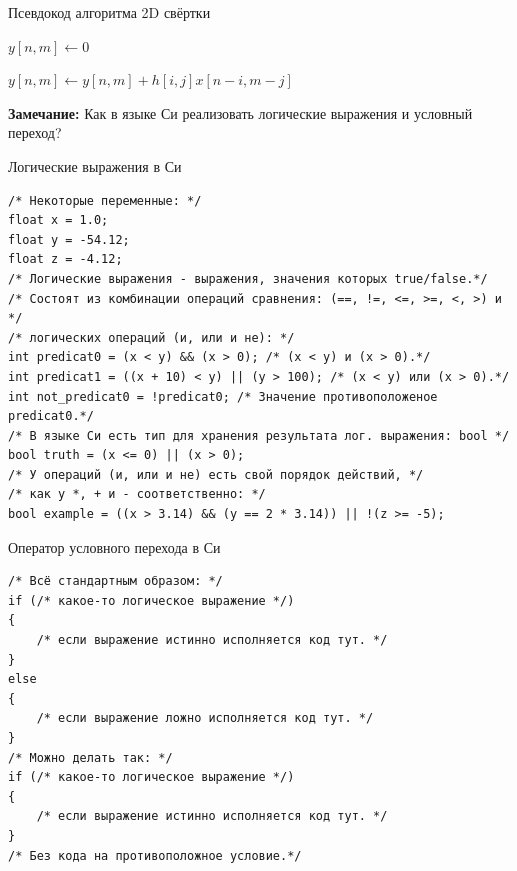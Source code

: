 \documentclass{beamer}
\begin{document}
    \begin{frame}{Псевдокод алгоритма 2D свёртки}
        \begin{algorithm}[H]
            \BlankLine
            {
                {
                    $y[n, m] \leftarrow 0$
                    \par
                    {
                        {
                            {
                                 $y[n, m] \leftarrow y[n, m] + h[i, j]x[n - i, m- j]$
                            }
                        }
                    }
                }
            }
        \end{algorithm}
        \par
        \justifying
        {\bf Замечание:} Как в языке Си реализовать логические выражения и условный переход?
    \end{frame}
    \begin{frame}[fragile]{Логические выражения в Си}
        \begin{verbatim}
/* Некоторые переменные: */
float x = 1.0;
float y = -54.12;
float z = -4.12;
/* Логические выражения - выражения, значения которых true/false.*/
/* Состоят из комбинации операций сравнения: (==, !=, <=, >=, <, >) и */
/* логических операций (и, или и не): */
int predicat0 = (x < y) && (x > 0); /* (x < y) и (x > 0).*/
int predicat1 = ((x + 10) < y) || (y > 100); /* (x < y) или (x > 0).*/
int not_predicat0 = !predicat0; /* Значение противоположеное predicat0.*/
/* В языке Си есть тип для хранения результата лог. выражения: bool */
bool truth = (x <= 0) || (x > 0);
/* У операций (и, или и не) есть свой порядок действий, */
/* как у *, + и - соответственно: */
bool example = ((x > 3.14) && (y == 2 * 3.14)) || !(z >= -5);
        \end{verbatim}
    \end{frame}
    \begin{frame}[fragile]{Оператор условного перехода в Си}
        \begin{verbatim}
/* Всё стандартным образом: */
if (/* какое-то логическое выражение */)
{
    /* если выражение истинно исполняется код тут. */
}
else
{
    /* если выражение ложно исполняется код тут. */
}
/* Можно делать так: */
if (/* какое-то логическое выражение */)
{
    /* если выражение истинно исполняется код тут. */
}
/* Без кода на противоположное условие.*/
        \end{verbatim}
    \end{frame}
\end{document}
